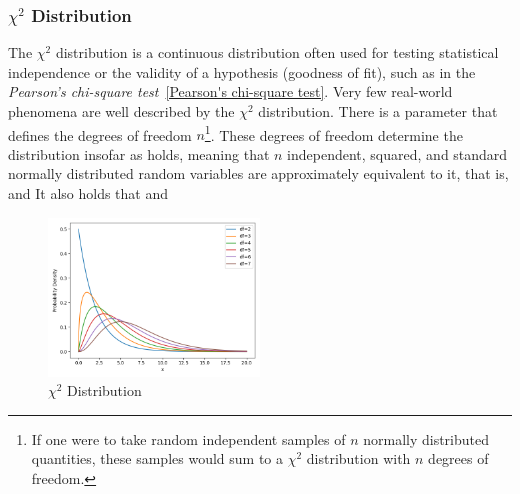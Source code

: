 \subsubsection{$\chi^2$ Distribution}\label{Chi Square Distribution}
The $\chi^2$ distribution is a continuous distribution often used for testing statistical independence or the validity of a hypothesis (goodness of fit), such as in the \textit{Pearson's chi-square test}~\ref{Pearson's chi-square test}. Very few real-world phenomena are well described by the $\chi^2$ distribution. There is a parameter that defines the degrees of freedom $n$\footnote{If one were to take random independent samples of $n$ normally distributed quantities, these samples would sum to a $\chi^2$ distribution with $n$ degrees of freedom.}. These degrees of freedom determine the distribution insofar as
holds, meaning that $n$ independent, squared, and standard normally distributed random variables are approximately equivalent to it, that is,
and
It also holds that
and

\begin{figure}[h]
    \centering
    \includegraphics[width=0.5\textwidth]{../images/plot_chi_squared_overlayed.png}
    \caption{$\chi^2$ Distribution}
    \label{fig:chi_square_distribution}
\end{figure}

